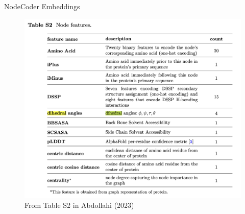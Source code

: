 \documentclass{beamer}
\begin{document}

\begin{frame}{NodeCoder Embeddings}
    \begin{figure}
        \centering 
        \includegraphics[scale=0.3]{NodeCoder_S2_Embeddings.png}
        \caption{From Table S2 in Abdollahi (2023) \cite{abdollahi_nodecoder_2023}}
    \end{figure}
\end{frame}
\end{document}
